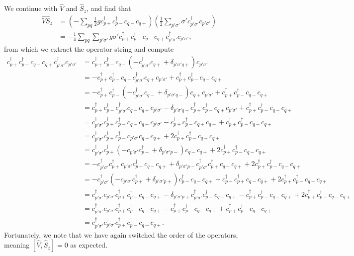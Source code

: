 \documentclass[a4paper]{article}
\newcommand{\nn}{\nonumber}
\newcommand{\cpp}{c_{p+}}
\newcommand{\cpm}{c_{p-}}
\newcommand{\cqp}{c_{q+}}
\newcommand{\cqm}{c_{q-}}
\begin{document}
We continue with $\hat V$ and $\hat S_z$, and find that
\begin{align}
\hat V \hat S_z &= \left(   - \sum_{pq}\frac{1}{2}g \cpp^\dagger \cpm^\dagger \cqm \cqp   \right)  \left(   \frac{1}{2}\sum_{p'\sigma'} \sigma' c_{p'\sigma'}^\dagger c_{p'\sigma'}  \right) \nn\\ 
%
&= -\frac{1}{4}\sum_{pq}\sum_{p'\sigma'}g\sigma' \cpp^\dagger \cpm^\dagger \cqm \cqp  c_{p'\sigma'}^\dagger c_{p'\sigma'},
\end{align}
from which we extract the operator string and compute
\begin{align}
\cpp^\dagger \cpm^\dagger \cqm \cqp  c_{p'\sigma'}^\dagger c_{p'\sigma'} &= \cpp^\dagger \cpm^\dagger \cqm (-  c_{p'\sigma'}^\dagger \cqp + \delta_{p'\sigma'q+}) c_{p'\sigma'} \nn\\
%
&= -\cpp^\dagger \cpm^\dagger  \cqm c_{p'\sigma'}^\dagger \cqp c_{p'\sigma'} + \cpp^\dagger \cpm^\dagger \cqm  \cqp \nn\\
%
&= -\cpp^\dagger \cpm^\dagger (- c_{p'\sigma'}^\dagger \cqm + \delta_{p'\sigma'q-}) \cqp c_{p'\sigma'} + \cpp^\dagger \cpm^\dagger \cqm  \cqp \nn\\
%
&= \cpp^\dagger \cpm^\dagger c_{p'\sigma'}^\dagger \cqm \cqp c_{p'\sigma'} - \delta_{p'\sigma'q-} \cpp^\dagger \cpm^\dagger \cqp c_{p'\sigma'}  + \cpp^\dagger \cpm^\dagger \cqm  \cqp \nn\\
%
&= c_{p'\sigma'}^\dagger \cpp^\dagger \cpm^\dagger \cqm \cqp c_{p'\sigma'} -  \cpp^\dagger \cpm^\dagger \cqp \cqm  + \cpp^\dagger \cpm^\dagger \cqm  \cqp \nn\\
%
&= c_{p'\sigma'}^\dagger \cpp^\dagger \cpm^\dagger c_{p'\sigma'} \cqm \cqp   + 2\cpp^\dagger \cpm^\dagger \cqm  \cqp \nn\\
%
&= c_{p'\sigma'}^\dagger \cpp^\dagger(-c_{p'\sigma'} \cpm^\dagger +\delta_{p'\sigma' p-}) \cqm \cqp   + 2\cpp^\dagger \cpm^\dagger \cqm  \cqp \nn\\
%
&= -c_{p'\sigma'}^\dagger \cpp^\dagger c_{p'\sigma'} \cpm^\dagger \cqm \cqp +\delta_{p'\sigma' p-} c_{p'\sigma'}^\dagger \cpp^\dagger \cqm \cqp  + 2\cpp^\dagger \cpm^\dagger \cqm  \cqp \nn\\
% 
&= -c_{p'\sigma'}^\dagger (- c_{p'\sigma'} \cpp^\dagger + \delta_{p'\sigma'p+}) \cpm^\dagger \cqm \cqp + \cpm^\dagger \cpp^\dagger \cqm \cqp  + 2\cpp^\dagger \cpm^\dagger \cqm  \cqp \nn\\
%
&= c_{p'\sigma'}^\dagger c_{p'\sigma'} \cpp^\dagger \cpm^\dagger \cqm \cqp - \delta_{p'\sigma'p+}c_{p'\sigma'}^\dagger \cpm^\dagger \cqm \cqp - \cpp^\dagger \cpm^\dagger  \cqm \cqp  + 2\cpp^\dagger \cpm^\dagger \cqm  \cqp \nn\\
%
&= c_{p'\sigma'}^\dagger c_{p'\sigma'} \cpp^\dagger \cpm^\dagger \cqm \cqp - \cpp^\dagger \cpm^\dagger \cqm \cqp + \cpp^\dagger \cpm^\dagger \cqm  \cqp \nn\\
%
&= c_{p'\sigma'}^\dagger c_{p'\sigma'} \cpp^\dagger \cpm^\dagger \cqm \cqp.
\end{align}
Fortunately, we note that we have again switched the order of the operators, meaning $[\hat V, \hat S_z]=0$ as expected.
\end{document}
